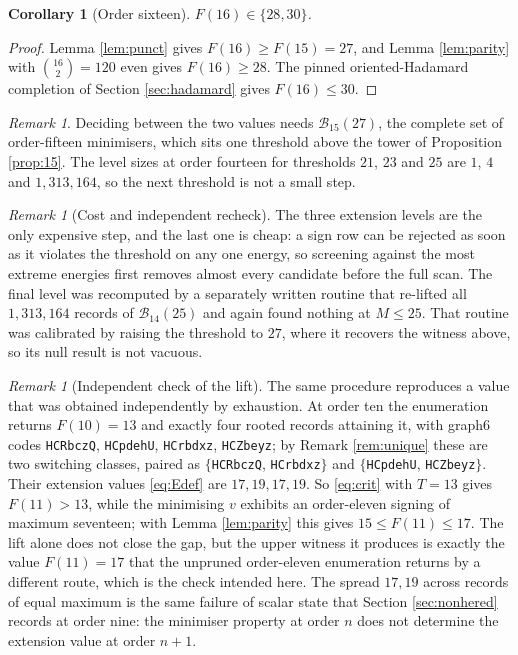 \documentclass[11pt]{article}
\newtheorem{corollary}[theorem]{Corollary}
\theoremstyle{remark}
\newtheorem{remark}[theorem]{Remark}
\begin{document}
\begin{corollary}[Order sixteen]\label{cor:16}
$F(16)\in\{28,30\}$.
\end{corollary}

\begin{proof}
Lemma \ref{lem:punct} gives $F(16)\ge F(15)=27$, and Lemma \ref{lem:parity}
with $\binom{16}2=120$ even gives $F(16)\ge28$.  The pinned oriented-Hadamard
completion of Section \ref{sec:hadamard} gives $F(16)\le30$.
\end{proof}

\begin{remark}
Deciding between the two values needs $\mathcal B_{15}(27)$, the complete set
of order-fifteen minimisers, which sits one threshold above the tower of
Proposition \ref{prop:15}.  The level sizes at order fourteen for thresholds
$21$, $23$ and $25$ are $1$, $4$ and $1{,}313{,}164$, so the next threshold is
not a small step.
\end{remark}

\begin{remark}[Cost and independent recheck]\label{rem:15cost}
The three extension levels are the only expensive step, and the last one is
cheap: a sign row can be rejected as soon as it violates the threshold on any
one energy, so screening against the most extreme energies first removes
almost every candidate before the full scan.  The final level was recomputed
by a separately written routine that re-lifted all $1{,}313{,}164$ records of
$\mathcal B_{14}(25)$ and again found nothing at $M\le25$.  That routine was
calibrated by raising the threshold to $27$, where it recovers the witness
above, so its null result is not vacuous.
\end{remark}

\begin{remark}[Independent check of the lift]\label{rem:liftcheck}
The same procedure reproduces a value that was obtained independently by
exhaustion.  At order ten the enumeration returns $F(10)=13$ and exactly four
rooted records attaining it, with graph6 codes \texttt{HCRbczQ},
\texttt{HCpdehU}, \texttt{HCrbdxz}, \texttt{HCZbeyz}; by Remark
\ref{rem:unique} these are two switching classes, paired as
$\{$\texttt{HCRbczQ}, \texttt{HCrbdxz}$\}$ and
$\{$\texttt{HCpdehU}, \texttt{HCZbeyz}$\}$.  Their extension values \eqref{eq:Edef}
are $17,19,17,19$.  So \eqref{eq:crit} with $T=13$ gives $F(11)>13$, while the
minimising $v$ exhibits an order-eleven signing of maximum seventeen; with
Lemma \ref{lem:parity} this gives $15\le F(11)\le17$.  The lift alone does not
close the gap, but the upper witness it produces is exactly the value
$F(11)=17$ that the unpruned order-eleven enumeration returns by a different
route, which is the check intended here.  The spread
$17,19$ across records of equal maximum is the same failure of scalar
state that Section \ref{sec:nonhered} records at order nine: the minimiser
property at order $n$ does not determine the extension value at order $n+1$.
\end{remark}
\end{document}
